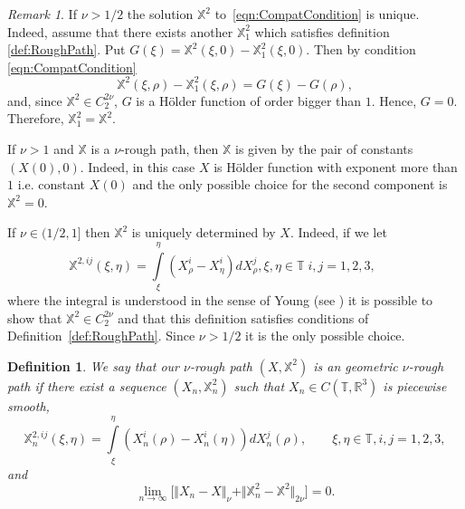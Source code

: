 \documentclass[11pt,a4paper,reqno]{amsart}%
\theoremstyle{plain}
\theoremstyle{remark}
\newtheorem{remark}[theorem]{Remark}
\theoremstyle{plain}
\newtheorem{definition}[theorem]{Definition}
\numberwithin{equation}{section}
\def\Rnu{{\mathbb R}}
\def\intl{\int\limits}
\begin{document}
\begin{remark}
If $\nu>1/2$ the solution $\mathbb{X}^{2}$ to~\eqref{eqn:CompatCondition} is unique. Indeed, assume that there exists another
$\mathbb{X}_1^{2}$ which satisfies definition \ref{def:RoughPath}.
Put $G(\xi)=\mathbb{X}^{2}(\xi,0)-\mathbb{X}_1^{2}(\xi,0)$. Then
by condition \ref{eqn:CompatCondition}
$$
\mathbb{X}^{2}(\xi,\rho)-\mathbb{X}_1^{2}(\xi,\rho)=G(\xi)-G(\rho),
$$
and, since $\mathbb{X}^{2}\in C_2^{2\nu}$, $G$ is a H\"{o}lder
function of order bigger  than $1$. Hence,  $G=0$. Therefore,
$\mathbb{X}_1^{2}=\mathbb{X}^{2}$.

If $\nu>1$ and $\mathbb{X}$ is a $\nu$-rough path, then
$\mathbb{X}$ is given by the pair of constants $(X(0),0)$. Indeed,
in this case $X$ is H\"older function with exponent more than $1$
i.e. constant $X(0)$ and the only possible choice for the second component is $\mathbb{X}^{2}=0$.

If $\nu\in({1}/{2},1]$ then $\mathbb{X}^2$ is
uniquely determined by $X$. Indeed, if we let
\begin{equation}
\mathbb{X}^{2,ij}(\xi,\eta)=\intl_{\xi}^{\eta}(X^i_{\rho}-X^i_{\eta})dX^j_{\rho},\xi,\eta\in
\mathbb{T}\; i,j=1,2,3, \qquad\label{eqn:YoungIntegralCase}
\end{equation}
where the integral is understood in the sense of Young (see
\cite{[Young-1936]}) it is possible to show that $\mathbb{X}^{2}\in C^{2\nu}_2$  and that this definition satisfies conditions of
Definition~\ref{def:RoughPath}. Since $\nu > 1/2$ it is the only possible choice.
\end{remark}
\begin{definition}\label{ass:RoughPathApproximability}
We say that our $\nu$-rough path $(X,\mathbb{X}^2)$  is an
geometric $\nu$-rough path if there exist a sequence
$(X_n,\mathbb{X}_n^2)$ such that
$
X_n\in C(\mathbb{T},\Rnu^3)
$ is piecewise smooth,
$$
\mathbb{X}_n^{2,ij}(\xi,\eta)=\intl_{\xi}^{\eta}(X_n^i({\rho})-X_n^i({\eta}))dX_n^j({\rho}),\qquad \xi,\eta\in
\mathbb{T},i,j=1,2,3,
$$
and
\begin{equation}
\lim_{n\to\infty}\big[\Vert X_n-X\Vert_{\nu}+\Vert \mathbb{X}_n^2-\mathbb{X}^2\Vert_{2\nu}\big]=
0.\label{eqn:RoughPathTopology}
\end{equation}
\end{definition}
\end{document}
